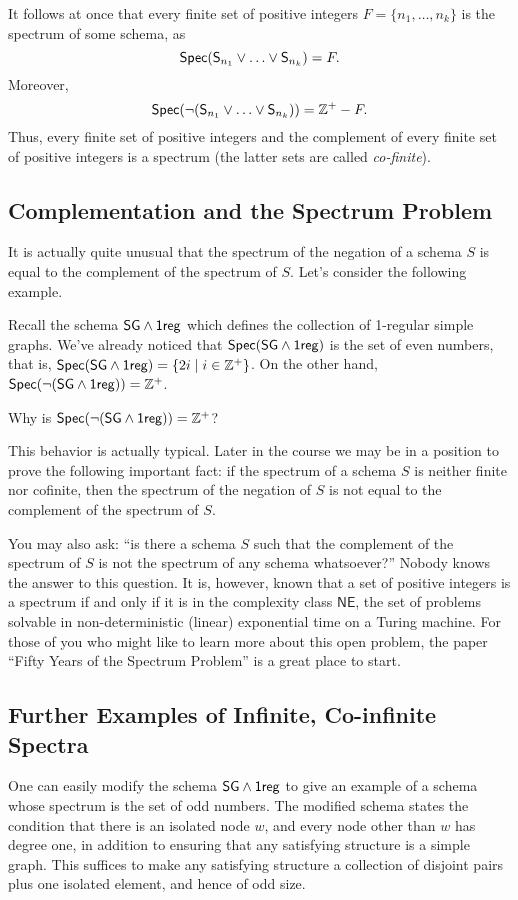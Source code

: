It follows at once that every finite set of positive integers $F=\{n_1,\ldots,n_k\}$ is the spectrum of some schema, as
\[
\mbox{$\mathsf{Spec}(\mathsf{S}_{n_1}\vee\ldots\vee\mathsf{S}_{n_k})$}= F.
\]
Moreover, 
\[
\mbox{$\mathsf{Spec}(\neg(\mathsf{S}_{n_1}\vee\ldots\vee\mathsf{S}_{n_k}))$}= \mathbb{Z}^+ - F.
\]
Thus, every finite set of positive integers and the complement of every finite set of positive integers is a spectrum (the latter sets are called \emph{co-finite}).


\subsection*{Complementation and the Spectrum Problem}
It is actually quite unusual that the spectrum of the negation of a schema $S$ is equal to the complement of the spectrum of $S$. Let's consider the following example.

Recall the schema $\mbox{$\mathsf{SG}$}\wedge\mbox{$\mathsf{1reg}$}$ which defines the collection of 1-regular simple graphs. We've already noticed that $\mbox{$\mathsf{Spec}(\mbox{$\mathsf{SG}$}\wedge\mbox{$\mathsf{1reg}$})$}$ is the set of even numbers, that is, $\mbox{$\mathsf{Spec}(\mbox{$\mathsf{SG}$}\wedge\mbox{$\mathsf{1reg}$})$}=\{2i\mid i\in\mathbb{Z}^+\}$. On the other hand, $\mbox{$\mathsf{Spec}(\neg(\mbox{$\mathsf{SG}$}\wedge\mbox{$\mathsf{1reg}$}))$}=\mathbb{Z}^+$.
\begin{aside}
    Why is $\mbox{$\mathsf{Spec}(\neg(\mbox{$\mathsf{SG}$}\wedge\mbox{$\mathsf{1reg}$}))$}=\mathbb{Z}^+$?
\end{aside}
This behavior is actually typical. Later in the course we may be in a position to prove the following important fact: if the spectrum of a schema $S$ is neither finite nor cofinite, then the spectrum of the negation of $S$ is not equal to the complement of the spectrum of $S$. 

You may also ask: ``is there a schema $S$ such that the complement of the spectrum of $S$ is not the spectrum of any schema whatsoever?'' Nobody knows the answer to this question. It is, however, known that a set of positive integers is a spectrum if and only if it is in the complexity class $\mathsf{NE}$, the set of problems solvable in non-deterministic (linear) exponential time on a Turing machine. For those of you who might like to learn more about this open problem, the paper ``Fifty Years of the Spectrum Problem'' is a great place to start. 

\subsection*{Further Examples of Infinite, Co-infinite Spectra}
One can easily modify the schema $\mbox{$\mathsf{SG}$}\wedge\mbox{$\mathsf{1reg}$}$ to give an example of a schema whose spectrum is the set of odd numbers. The modified schema states the condition that there is an isolated node $w$, and every node other than $w$ has degree one, in addition to ensuring that any satisfying structure is a simple graph. This suffices to make any satisfying structure a collection of disjoint pairs plus one isolated element, and hence of odd size. 

